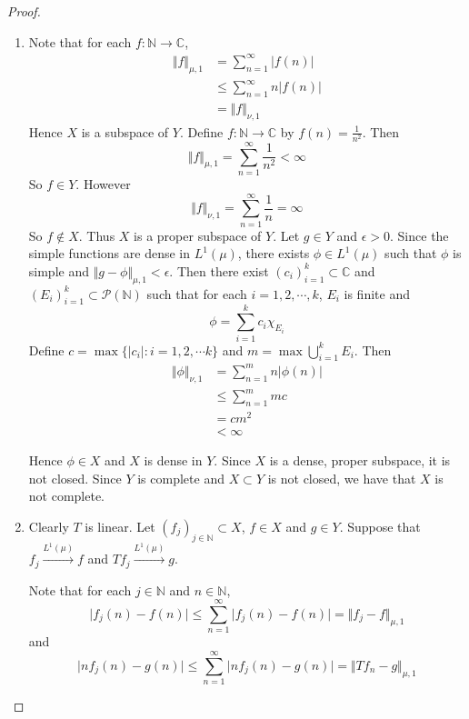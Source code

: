 \documentclass[12pt]{amsart}
\newcommand{\ep}{\epsilon}
\newcommand{\C}{\mathbb{C}}
\newcommand{\N}{\mathbb{N}}
\newcommand{\MP}{\mathcal{P}}
\newcommand{\conv}[1]{\xrightarrow{#1}}
\newcommand{\n}{\Vert}
\begin{document}
\begin{proof}
\begin{enumerate}
\item Note that for each $f: \N \rightarrow \C$, 
\begin{align*}
{\n f \n}_{\mu, 1}
&= \sum_{n=1}^{\infty} \vert f(n) \vert  \\
& \leq \sum_{n=1}^{\infty} n \vert f(n) \vert  \\
& = \n f \n_{\nu,1} 
\end{align*} 
Hence $X$ is a subspace of $Y$. Define $f : \N \rightarrow \C$ by $f(n) = \frac{1}{n^2}$. Then $$\n f \n_{\mu, 1} = \sum_{n=1}^{\infty} \frac{1}{n^2} < \infty$$ So  $f \in Y$. However $$\n f \n_{\nu, 1} = \sum_{n=1}^\infty \frac{1}{n} = \infty$$ So $f \not \in X$. Thus $X$ is a proper subspace of $Y$. Let $g \in Y$ and $\ep >0$. Since the simple functions are dense in $L^1(\mu)$, there exists $\phi \in L^1(\mu)$ such that $\phi$ is simple and $\n g - \phi \n_{\mu ,1} < \ep$. Then there exist $(c_i)_{i=1}^k \subset \C$ and $ (E_i)_{i=1}^k \subset \MP(\N)$ such that for each $i =1,2,\cdots, k$, $E_i$ is finite and  $$\phi = \sum_{i=1}^kc_i \chi_{E_i}$$ Define $c = \max\{\vert c_i \vert: i=1,2,\cdots k\}$ and $m = \max \bigcup_{i=1}^k E_i$. Then 
\begin{align*}
\n \phi \n_{\nu,1} 
&=  \sum_{n=1}^m n \vert \phi(n) \vert \\
& \leq \sum_{n=1}^m  mc \\
& = c m^2 \\
& < \infty
\end{align*}

Hence $\phi \in X$ and $X$ is dense in $Y$. Since $X$ is a dense, proper subspace, it is not closed. Since $Y$ is complete and $X \subset Y$ is not closed, we have that $X$ is not complete.
\item Clearly $T$ is linear. Let $(f_j)_{j \in \N} \subset X$, $f \in X$ and $g \in Y$. Suppose that $f_j \conv{L^1(\mu)} f$ and $Tf_j \conv{L^1(\mu)} g$. 

Note that for each $j \in \N$ and $n \in \N$, $$\vert f_j(n) - f(n) \vert \leq \sum_{n =1}^{\infty}\vert f_j(n) - f(n) \vert = \n f_j-f \n_{\mu, 1}$$ and $$\vert nf_j(n) - g(n) \vert \leq \sum_{n =1}^{\infty}\vert nf_j(n) - g(n) \vert = \n Tf_n - g\n_{\mu, 1}$$  


\end{enumerate}
\end{proof}
\end{document}
